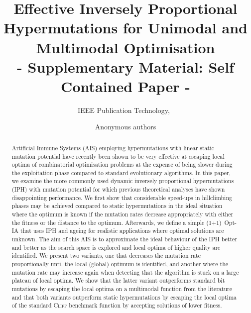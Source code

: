 \documentclass[lettersize,journal]{IEEEtran}
\begin{document}
\title{Effective Inversely Proportional Hypermutations for Unimodal and Multimodal Optimisation\\ - Supplementary Material: Self Contained Paper -}

\author{IEEE Publication Technology,~	

}
\author{Anonymous authors	

}



\maketitle

\begin{abstract}

Artificial Immune Systems (AIS) employing hypermutations with linear static mutation potential have recently been shown to be very effective at escaping local optima of combinatorial optimisation problems at the expense of being slower during the exploitation phase compared to standard evolutionary algorithms.
In this paper, we examine the more commonly used dynamic inversely proportional  hypermutations (IPH) with mutation potential for which previous theoretical analyses have shown disappointing performance. We first show that considerable speed-ups
in hillclimbing phases may be achieved compared to static hypermutations in the ideal situation where the optimum is known if the mutation rates decrease appropriately with either the fitness or the distance to the optimum. Afterwards, we define a simple (1+1)~Opt-IA that uses IPH and ageing for realistic applications where optimal solutions are unknown. The aim of this AIS is to approximate the ideal behaviour of the IPH better and better as the search space is explored and local optima of higher quality are identified.
We present two variants, one that decreases the mutation rate proportionally until the local (global) optimum is identified, and another where the mutation rate may increase again when detecting that the algorithm is stuck on a large plateau of local optima.
We show that the latter variant outperforms standard bit mutations by escaping the local optima on a multimodal function from the literature and that both variants outperform static hypermutations by escaping the local optima of the standard \textsc{Cliff} benchmark function by accepting solutions of lower fitness.  
\end{abstract}
\end{document}
